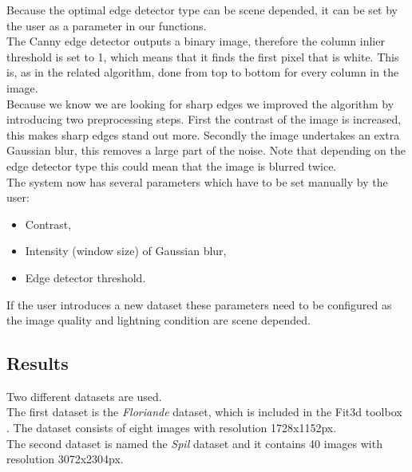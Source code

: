 Because the optimal edge detector type can be scene depended, it can be set
by the user as a parameter in our functions.\\

The Canny edge detector outputs a binary image, therefore the column inlier
threshold is set to 1, which means that it finds the first pixel that is white. 
This is, as in the related algorithm, done from top to bottom for every column in
the image.\\

Because we know we are looking for sharp edges we improved the algorithm by
introducing two preprocessing steps. First the contrast of the image is
increased, this makes sharp edges stand out more.  Secondly the image undertakes
an extra Gaussian blur, this removes a large part of the noise. Note that
depending on the edge detector type this could mean that the image is blurred
twice.\\

The system now has several parameters which have to be set manually by the user:
\begin{itemize}
	\item Contrast,
	\item Intensity (window size) of Gaussian blur,
	\item Edge detector threshold.
\end{itemize}

If the user introduces a new dataset these parameters need to be configured
as the image quality and lightning condition are scene depended.


\subsection{Results}
Two different datasets are used. \\
The first dataset is the \emph{Floriande} dataset, which is included in the
Fit3d toolbox \cite{Fit3d}.  The dataset consists of eight images with resolution 1728x1152px.\\
The second dataset is named the \emph{Spil} dataset and it contains 40 images
with resolution 3072x2304px.\\

